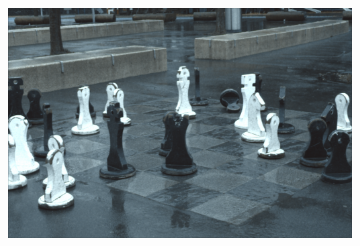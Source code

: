 \begin{figure}
\begin{subfigure}[t]{.24\textwidth}
      \end{subfigure}
    \hfill
    \begin{subfigure}[t]{.24\textwidth}
      \centering
      \includegraphics[width=\linewidth]{figures/color-vgg-tv-relative-chess.png}
    \end{subfigure}


\end{figure}
